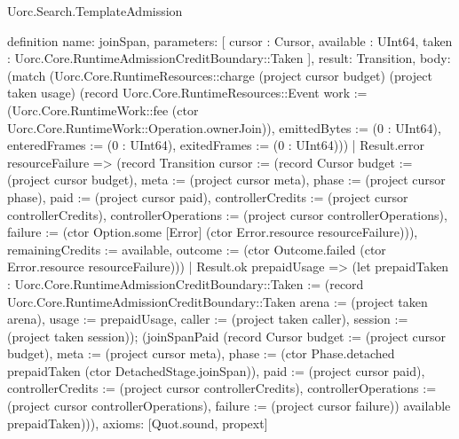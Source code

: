 \begin{lexlean}{Uorc.Search.TemplateAdmission}
\begin{semanticmodule}
definition{
  name: joinSpan,
  parameters: [
    cursor : Cursor,
    available : UInt64,
    taken : Uorc.Core.RuntimeAdmissionCreditBoundary::Taken
  ],
  result: Transition,
  body: (match (Uorc.Core.RuntimeResources::charge (project cursor budget) (project taken usage) (record Uorc.Core.RuntimeResources::Event {work := (Uorc.Core.RuntimeWork::fee (ctor Uorc.Core.RuntimeWork::Operation.ownerJoin)), emittedBytes := (0 : UInt64), enteredFrames := (0 : UInt64), exitedFrames := (0 : UInt64)}))
    | Result.error resourceFailure => (record Transition {cursor := (record Cursor {budget := (project cursor budget), meta := (project cursor meta), phase := (project cursor phase), paid := (project cursor paid), controllerCredits := (project cursor controllerCredits), controllerOperations := (project cursor controllerOperations), failure := (ctor Option.some [Error] (ctor Error.resource resourceFailure))}), remainingCredits := available, outcome := (ctor Outcome.failed (ctor Error.resource resourceFailure))})
    | Result.ok prepaidUsage => (let prepaidTaken : Uorc.Core.RuntimeAdmissionCreditBoundary::Taken := (record Uorc.Core.RuntimeAdmissionCreditBoundary::Taken {arena := (project taken arena), usage := prepaidUsage, caller := (project taken caller), session := (project taken session)}); (joinSpanPaid (record Cursor {budget := (project cursor budget), meta := (project cursor meta), phase := (ctor Phase.detached prepaidTaken (ctor DetachedStage.joinSpan)), paid := (project cursor paid), controllerCredits := (project cursor controllerCredits), controllerOperations := (project cursor controllerOperations), failure := (project cursor failure)}) available prepaidTaken))),
  axioms: [Quot.sound, propext]
}


\end{semanticmodule}
\end{lexlean}
